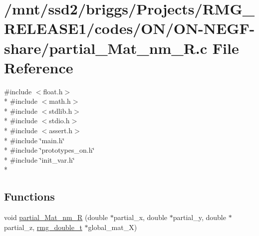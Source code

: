 \hypertarget{_o_n_2_o_n-_n_e_g_f-share_2partial___mat__nm___r_8c}{\section{/mnt/ssd2/briggs/\-Projects/\-R\-M\-G\-\_\-\-R\-E\-L\-E\-A\-S\-E1/codes/\-O\-N/\-O\-N-\/\-N\-E\-G\-F-\/share/partial\-\_\-\-Mat\-\_\-nm\-\_\-\-R.c File Reference}
\label{_o_n_2_o_n-_n_e_g_f-share_2partial___mat__nm___r_8c}
}
{\ttfamily \#include $<$float.\-h$>$}\\*
{\ttfamily \#include $<$math.\-h$>$}\\*
{\ttfamily \#include $<$stdlib.\-h$>$}\\*
{\ttfamily \#include $<$stdio.\-h$>$}\\*
{\ttfamily \#include $<$assert.\-h$>$}\\*
{\ttfamily \#include \char`\"{}main.\-h\char`\"{}}\\*
{\ttfamily \#include \char`\"{}prototypes\-\_\-on.\-h\char`\"{}}\\*
{\ttfamily \#include \char`\"{}init\-\_\-var.\-h\char`\"{}}\\*
\subsection*{Functions}
\begin{DoxyCompactItemize}
\item 
void \hyperlink{_o_n_2_o_n-_n_e_g_f-share_2partial___mat__nm___r_8c_a27143f61ef8205ba82ae884d60e81396}{partial\-\_\-\-Mat\-\_\-nm\-\_\-\-R} (double $\ast$partial\-\_\-x, double $\ast$partial\-\_\-y, double $\ast$partial\-\_\-z, \hyperlink{rmgtypes_8h_aaa16921c14f121c56eaa42390a340db8}{rmg\-\_\-double\-\_\-t} $\ast$global\-\_\-mat\-\_\-\-X)
\end{DoxyCompactItemize}


